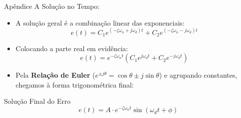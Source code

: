 \documentclass[11pt, aspectratio=169]{beamer}
\begin{document}
\begin{frame}{Apêndice A}
    \Large{Solução no Tempo:}
    \begin{itemize}
        \item A solução geral é a combinação linear das exponenciais:
        \[ e(t) = C_1 e^{(-\zeta\omega_n + j\omega_d)t} + C_2 e^{(-\zeta\omega_n - j\omega_d)t} \]
        \item Colocando a parte real em evidência:
        \[ e(t) = e^{-\zeta\omega_n t} \left( C_1 e^{j\omega_d t} + C_2 e^{-j\omega_d t} \right) \]
        \item Pela \textbf{Relação de Euler} ($e^{\pm j\theta} = \cos\theta \pm j\sin\theta$) e agrupando constantes, chegamos à forma trigonométrica final:
    \end{itemize}
    
    \begin{block}{Solução Final do Erro}
        \[ e(t) = A \cdot e^{-\zeta\omega_n t} \sin(\omega_d t + \phi) \]
    \end{block}
\end{frame}
\end{document}
